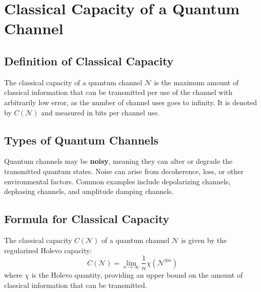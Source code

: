 \section{Classical Capacity of a Quantum Channel}

\subsection{Definition of Classical Capacity}
The classical capacity of a quantum channel \( \mathcal{N} \) is the maximum amount of classical information that can be transmitted per use of the channel with arbitrarily low error, as the number of channel uses goes to infinity. It is denoted by \( C(\mathcal{N}) \) and measured in bits per channel use.

\subsection{Types of Quantum Channels}
Quantum channels may be \textbf{noisy}, meaning they can alter or degrade the transmitted quantum states. Noise can arise from decoherence, loss, or other environmental factors. Common examples include depolarizing channels, dephasing channels, and amplitude damping channels.

\subsection{Formula for Classical Capacity}
The classical capacity \( C(\mathcal{N}) \) of a quantum channel \( \mathcal{N} \) is given by the regularized Holevo capacity:
\begin{equation}
    C(\mathcal{N}) = \lim_{n \to \infty} \frac{1}{n} \chi\left(\mathcal{N}^{\otimes n}\right)
\end{equation}
where \( \chi \) is the Holevo quantity, providing an upper bound on the amount of classical information that can be transmitted.